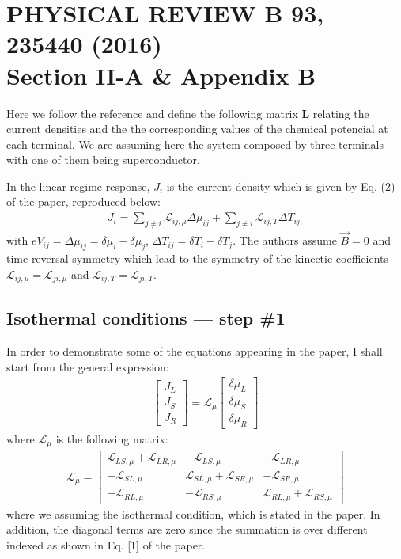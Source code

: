 \section{PHYSICAL REVIEW B 93, 235440 (2016)\\Section II-A \& Appendix B}

Here we follow the reference and define the following matrix $\mathbf{L}$ relating the current densities and the the corresponding values of the chemical potencial at each terminal. We are assuming here the system composed by three terminals with one of them being superconductor. 


In the linear regime response, $J_{i}$ is the current density which is given by Eq. (2) of the paper, reproduced below:
\begin{align}\label{Ji}
J_{i}=\sum_{j\neq i}\mathcal{L}_{ij,\mu}\Delta\mu_{ij}+\sum_{j\neq i}\mathcal{L}_{ij,T}\Delta T_{ij,}
\end{align}
with
$eV_{ij}=\Delta\mu_{ij}=\delta\mu_{i}-\delta\mu_{j}$, $\Delta T_{ij}=\delta T_{i}-\delta T_{j}$. The authors assume $\vec{B}=0$ and time-reversal symmetry which lead to the symmetry of the kinectic coefficients $\mathcal{L}_{ij,\mu}=\mathcal{L}_{ji,\mu}$ and $\mathcal{L}_{ij, T}=\mathcal{L}_{ji,T}$.


\subsection{Isothermal conditions --- step \#1}

In order to demonstrate some of the equations appearing in the paper, I shall start from the general expression:
\begin{align*}
\begin{bmatrix}
J_{L}
\\
J_{S}
\\
J_{R}
\end{bmatrix}
=
\boldsymbol{\mathcal{L}}_{\mu}
\begin{bmatrix}
    \delta\mu_{L}
    \\
    \delta\mu_{S}
    \\
    \delta\mu_{R}
    \end{bmatrix}
\end{align*}
where $\boldsymbol{\mathcal{L}}_{\mu}$ is the following matrix:
\begin{align*}\boldsymbol{\mathcal{L}}_{\mu}
=
\begin{bmatrix}
\mathcal{L}_{LS,\mu}+\mathcal{L}_{LR,\mu} & -\mathcal{L}_{LS,\mu} & -\mathcal{L}_{LR,\mu}
\\
-\mathcal{L}_{SL,\mu} & \mathcal{L}_{SL,\mu}+\mathcal{L}_{SR,\mu} & -\mathcal{L}_{SR,\mu}
\\
-\mathcal{L}_{RL,\mu} & -\mathcal{L}_{RS,\mu} & \mathcal{L}_{RL,\mu}+\mathcal{L}_{RS,\mu}
\end{bmatrix}
\end{align*}
where we assuming the isothermal condition, which is stated in the paper. In addition, the diagonal terms are zero since the summation is over different indexed as shown in Eq. [1] of the paper.

